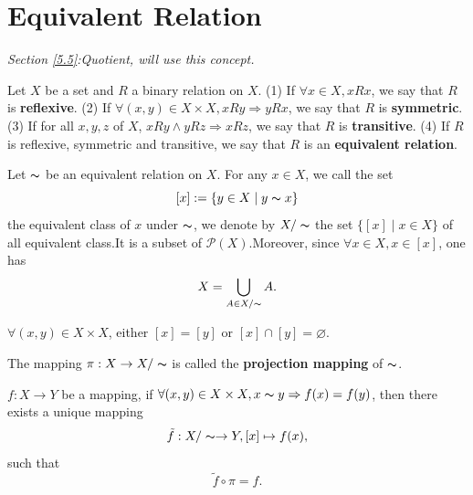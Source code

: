 \section{Equivalent Relation}\label{4.2}
\textit{Section \ref{5.5}:Quotient,  will use this concept.}
\begin{definitionenv}
    Let $X$ be a set and $R$ a binary relation on $X$.
    \newline
    (1) If $\forall x \in X , xRx$,  we say that $R$ is \textbf{reflexive}.
    \newline
    (2) If $\forall (x, y) \in X\times X, xRy\Rightarrow yRx$, we say that $R$ is \textbf{symmetric}.
    \newline
    (3) If for all $x, y, z$ of $X$,  $xRy\wedge yRz\Rightarrow xRz$, we say that $R$ is \textbf{transitive}.
    \newline
    (4) If $R$ is reflexive, symmetric and transitive,  we say that $R$ is an \textbf{equivalent relation}.

\end{definitionenv}
\begin{definitionenv}
    Let $\thicksim$ be an equivalent relation on $X$. For any $x\in X$,  we call the set $$[x]:=\{y\in X\mid y\thicksim x\}$$ the equivalent class of $x$ under $\thicksim$, we denote by $X/\thicksim$ the set $\{[x]\mid x\in X\}$ of all equivalent class.It is a subset of $\mathscr{P} (X)$.Moreover,  since $\forall x\in X, x\in [x] $,  one has $$X=\bigcup_{A\in X/\thicksim}A.$$
\end{definitionenv}
\begin{propositionenv}
    $\forall (x, y)\in X\times X$,  either $[x]=[y]$ or $[x]\cap [y]=\varnothing$.
\end{propositionenv}
\begin{definitionenv}
    The mapping $\pi :X\rightarrow X/\thicksim$ is called the \textbf{projection mapping} of $\thicksim$.
\end{definitionenv}
\begin{propositionenv}\label{4.2.5}
    $f:X\rightarrow Y$ be a mapping, if $\forall (x, y)\in X\times X, x\thicksim y\Rightarrow f(x)=f(y)$, then there exists a unique mapping$$\tilde{f}:X/\thicksim\rightarrow Y,  [x]\mapsto f(x), $$ such that $$\tilde{f}\circ \pi =f.$$


\begin{center}
\end{center}
\end{propositionenv}

